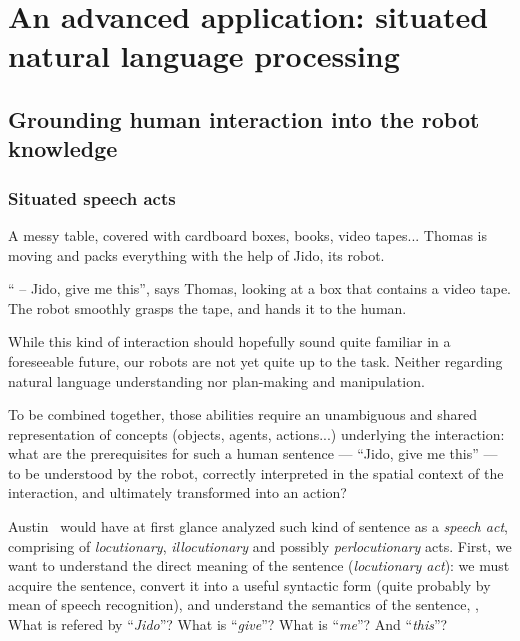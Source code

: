 \chapter{An advanced application: situated natural language processing}
\label{chapter|dialogs}



\section{Grounding human interaction into the robot knowledge}
\label{sect|dialogs}

\subsection{Situated speech acts}
\label{intro_example}

A messy table, covered with cardboard boxes, books, video tapes... Thomas is
moving and packs everything with the help of Jido, its robot.

`` -- Jido, give me this'', says Thomas, looking at a box that contains a video
tape. The robot smoothly grasps the tape, and hands it to the human.

While this kind of interaction should hopefully sound quite familiar in a
foreseeable future, our robots are not yet quite up to the task. Neither
regarding natural language understanding nor plan-making and manipulation.

To be combined together, those abilities require an unambiguous and shared
representation of concepts (objects, agents, actions...) underlying the
interaction: what are the prerequisites for such a
human sentence --- ``Jido, give me this'' --- to be understood by the robot,
correctly interpreted in the spatial context of the interaction, and ultimately
transformed into an action?

Austin~\cite{Austin1962} would have at first glance analyzed such kind of
sentence as a \emph{speech act}, comprising of \emph{locutionary},
\emph{illocutionary} and possibly \emph{perlocutionary} acts. First, we want to
understand the direct meaning of the sentence (\emph{locutionary act}): we must
acquire the sentence, convert it into a useful syntactic form (quite probably
by mean of speech recognition), and understand the semantics of the sentence,
\ie, What is refered by ``\textit{Jido}''? What is ``\textit{give}''? What is
``\textit{me}''? And ``\textit{this}''?

